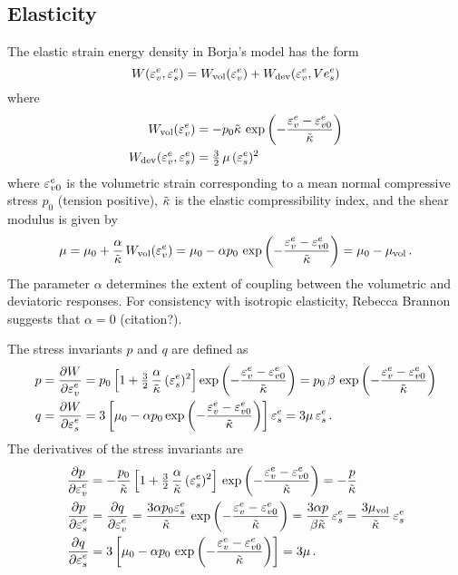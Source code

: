 \subsection{Elasticity}
The elastic strain energy density in Borja's model has the form
\[
  W(\varepsilon^e_v,\varepsilon^e_s) = W_{\text{vol}}(\varepsilon^e_v) + W_{\text{dev}}(\varepsilon^e_v, Ve^e_s)
\]
where
\[
   \begin{aligned}
    W_{\text{vol}}(\varepsilon^e_v) & = -p_0\tilde{\kappa}\,\exp\left(-\frac{\varepsilon^e_v - \varepsilon^e_{v0}}{\tilde{\kappa}}\right) \\
    W_{\text{dev}}(\varepsilon^e_v,\varepsilon^e_s) & =  \tfrac{3}{2}\,\mu\,(\varepsilon^e_s)^2
   \end{aligned}
\]
where $\varepsilon^e_{v0}$ is the volumetric strain corresponding to a mean normal compressive stress $p_0$ 
(tension positive), $\tilde{\kappa}$ is the elastic compressibility index, and the shear modulus is given by
\[
  \mu = \mu_0 + \frac{\alpha}{\tilde{\kappa}}\,W_{\text{vol}}(\varepsilon^e_v) 
      = \mu_0 - \alpha p_0\,\exp\left(-\frac{\varepsilon^e_v - \varepsilon^e_{v0}}{\tilde{\kappa}}\right) 
      = \mu_0 - \mu_{\text{vol}}\,.
\]
The parameter $\alpha$ determines the extent of coupling between the volumetric and deviatoric 
responses.  For consistency with isotropic elasticity, Rebecca Brannon suggests that $\alpha = 0$ (citation?). 

The stress invariants $p$ and $q$ are defined as
\[
  \begin{aligned}
    p &= \frac{\displaystyle\partial W}{\displaystyle\partial \varepsilon^e_v} = p_0\left[1 + \tfrac{3}{2}\,\frac{\alpha}{\tilde{\kappa}}\,(\varepsilon^e_s)^2\right]
         \exp\left(-\frac{\varepsilon^e_v - \varepsilon^e_{v0}}{\tilde{\kappa}}\right) 
       = p_0\,\beta\,\exp\left(-\frac{\varepsilon^e_v - \varepsilon^e_{v0}}{\tilde{\kappa}}\right) \\
    q &= \frac{\displaystyle\partial W}{\displaystyle\partial \varepsilon^e_s} = 3\left[\mu_0 - \alpha p_0\exp\left(-\frac{\varepsilon^e_v - \varepsilon^e_{v0}}{\tilde{\kappa}}\right) 
         \right]\varepsilon^e_s  = 3\mu\,\varepsilon^e_s\,.
  \end{aligned}
\]
The derivatives of the stress invariants are
\[
  \begin{aligned}
    \frac{\displaystyle\partial p}{\displaystyle\partial \varepsilon^e_v} & = -\frac{p_0}{\tilde{\kappa}}
         \left[1 + \tfrac{3}{2}\,\frac{\alpha}{\tilde{\kappa}}\,(\varepsilon^e_s)^2\right]
         \,\exp\left(-\frac{\varepsilon^e_v - \varepsilon^e_{v0}}{\tilde{\kappa}}\right) 
        = -\frac{p}{\tilde{\kappa}} \\
    \frac{\displaystyle\partial p}{\displaystyle\partial \varepsilon^e_s} & = \frac{\displaystyle\partial q}{\displaystyle\partial \varepsilon^e_v} = \frac{3\alpha p_0 \varepsilon^e_s}{\tilde{\kappa}}
         \,\exp\left(-\frac{\varepsilon^e_v - \varepsilon^e_{v0}}{\tilde{\kappa}}\right) = \frac{3\alpha p}{\beta \tilde{\kappa}}\,\varepsilon^e_s 
         = \frac{3\mu_{\text{vol}}}{\tilde{\kappa}}\,\varepsilon^e_s\\
    \frac{\displaystyle\partial q}{\displaystyle\partial \varepsilon^e_s} & = 3 \left[\mu_0 - \alpha p_0
         \,\exp\left(-\frac{\varepsilon^e_v - \varepsilon^e_{v0}}{\tilde{\kappa}}\right) \right] = 3 \mu\,.
  \end{aligned}
\]

